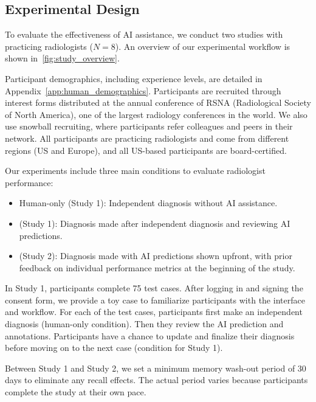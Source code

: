 
\subsection{Experimental Design}



To evaluate the effectiveness of AI assistance, we conduct two studies with practicing radiologists ($N=8$). An overview of our experimental workflow is shown in~\cref{fig:study_overview}. 


Participant demographics, including experience levels, are detailed in Appendix~\ref{app:human_demographics}. Participants are recruited through interest forms distributed at the annual conference of RSNA (Radiological Society of North America), one of the largest radiology conferences in the world. 
We also use snowball recruiting, where participants refer colleagues and peers in their network. All participants are practicing radiologists and come from different regions (US and Europe), and all US-based participants are board-certified.





Our experiments include three main conditions to evaluate radiologist performance:

\begin{itemize}[nosep]
    \item Human-only (Study 1): Independent diagnosis without AI assistance.
    \item \hai (Study 1): Diagnosis made after independent diagnosis and reviewing AI predictions.
    \item \hai (Study 2): Diagnosis made with AI predictions shown upfront, with prior feedback on individual performance metrics at the beginning of the study.
\end{itemize}



In Study 1, participants complete 75 test cases.
After logging in and signing the consent form, we provide a toy case to familiarize participants with the interface and workflow.
For each of the test cases, participants first make an independent diagnosis (human-only condition).
Then they review the AI prediction and annotations.
Participants have a chance to update and finalize their diagnosis before moving on to the next case (\hai condition for Study 1).



Between Study 1 and Study 2, we set a minimum memory wash-out period of 30 days to eliminate any recall effects. 
The actual period varies because participants complete the study at their own pace.



